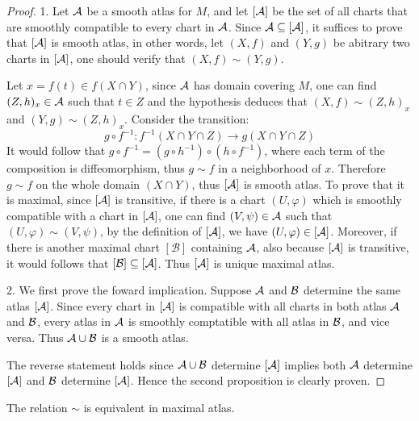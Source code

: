 \begin{proof}
    1. Let $\mathcal{A}$ be a smooth atlas for $M$, and let $[\mathcal{A}]$ be the set of all charts that are smoothly compatible to every chart in $\mathcal{A}$. Since $\mathcal{A} \subseteq [\mathcal{A}]$, it suffices to prove that $[\mathcal{A}]$ is smooth atlas, in other words, let $(X,f)$ and $(Y,g)$ be abitrary two charts in $[\mathcal{A}]$, one should verify that $(X,f) \sim (Y,g)$.

    Let $x = f(t) \in f(X \cap Y)$, since $\mathcal{A}$ has domain covering $M$, one can find $(Z,h)_x \in \mathcal{A}$ such that $t \in Z$ and the hypothesis deduces that $(X,f) \sim (Z,h)_x$ and $(Y,g) \sim (Z,h)_x$. Consider the transition:
    \[
        g \circ f^{-1}: f^{-1}(X \cap Y \cap Z) \to g(X \cap Y \cap Z)
    \]
    It would follow that $g \circ f^{-1} = (g \circ h^{-1}) \circ (h \circ f^{-1})$, where each term of the composition is diffeomorphism, thus $g \sim f$ in a neighborhood of $x $. Therefore $g \sim f$ on the whole domain $(X \cap Y)$, thus $[\mathcal{A}]$ is smooth atlas. To prove that it is maximal, since $[\mathcal{A}]$ is transitive, if there is a chart $(U,\varphi)$ which is smoothly compatible with a chart in $[\mathcal{A}]$, one can find $(V,\psi) \in \mathcal{A}$ such that $(U, \varphi) \sim (V, \psi)$, by the definition of $[\mathcal{A}]$, we have $(U,\varphi) \in [\mathcal{A}]$. Moreover, if there is another maximal chart $[\mathcal{B}]$ containing $\mathcal{A}$, also because $[\mathcal{A}]$ is transitive, it would follows that $[\mathcal{B}] \subseteq [\mathcal{A}]$. Thus $[\mathcal{A}]$ is unique maximal atlas.

    2. We first prove the foward implication. Suppose $\mathcal{A}$ and $\mathcal{B}$ determine the same atlas $[\mathcal{A}]$. Since every chart in $[\mathcal{A}]$ is compatible with all charts in both atlas $\mathcal{A}$ and $\mathcal{B}$, every atlas in $\mathcal{A}$ is smoothly comptatible with all atlas in $\mathcal{B}$, and vice versa. Thus $\mathcal{A} \cup \mathcal{B}$ is a smooth atlas.

    The reverse statement holds since $\mathcal{A} \cup \mathcal{B}$ determine $[\mathcal{A}]$ implies both $\mathcal{A}$ determine $[\mathcal{A}]$ and $\mathcal{B}$ determine $[\mathcal{A}]$. Hence the second proposition is clearly proven.
\end{proof}
\begin{corollary}
    The relation $\sim$ is equivalent in maximal atlas.
\end{corollary}
